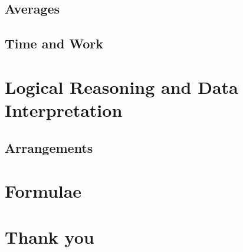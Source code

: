 \documentclass{book}
\begin{document}
\chapter{Averages}


\chapter{Time and Work}




\part{Logical Reasoning and Data Interpretation}

\chapter{Arrangements}





\part{Formulae}


\part{Thank you}
\end{document}
